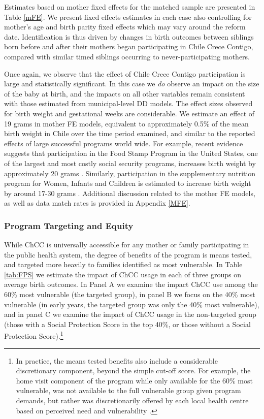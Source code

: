 \documentclass[12pt]{article}
\begin{document}
\begin{spacing}{1.4}
Estimates based on mother fixed effects for the matched sample
are presented in Table \ref{mFE}. We present fixed effects
estimates in each case also controlling for mother's age and birth
parity fixed effects which may vary around the reform date.
Identification is thus driven by changes in birth outcomes between
siblings born before and after their
mothers began participating in Chile Crece Contigo, compared with
similar timed siblings occurring to never-participating mothers.

Once again, we observe that the effect of Chile Crece Contigo
participation is large and statistically significant.  In this
case we \emph{do} observe an impact on the size of the baby at
birth, and the impacts on all other variables remain consistent
with those estimated from municipal-level DD models.  The effect
sizes observed for birth weight and gestational weeks are
considerable.  We estimate an effect of 19 grams in mother FE
models, equivalent to approximately 0.5\% of the mean birth
weight in Chile over the time period examined, and similar to the
reported effects of large successful programs world wide.  For
example, recent evidence suggests that participation in the Food
Stamp Program in the United States, one of the largest and most
costly social security programs, increases birth weight by
approximately 20 grams \citep{Almondetal2011}. Similarly,
participation in the supplementary nutrition program for Women,
Infants and Children is estimated to increase birth weight
by around 17-30 grams \citep{Hoynesetal2011,RossinSlater2013}.
Additional discussion related to the mother FE models, as well
as data match rates is provided in Appendix \ref{MFE}.


\subsubsection{Program Targeting and Equity}
While ChCC is universally accessible for any mother or family
participating in the public health system, the degree of benefits
of the program is means tested, and targeted more heavily to
families identified as most vulnerable.  In Table \ref{tab:FPS}
we estimate the impact of ChCC usage in each of three groups on
average birth outcomes.  In Panel A we examine the impact ChCC
use among the 60\% most vulnerable (the targeted group), in panel
B we focus on the 40\% most vulnerable (in early years, the targeted
group was only the 40\% most vulnerable), and in panel C we
examine the impact of ChCC usage in the non-targeted group (those
with a Social Protection Score in the top 40\%, or those without a
Social Protection Score).\footnote{In practice, the means
  tested benefits also include a considerable discretionary
  component, beyond the simple cut-off score.  For example, the
  home visit component of the program while only available for
  the 60\% most vulnerable, was not available to the full
  vulnerable group given program demands, but rather was
  discretionarily offered by each local health centre based
on perceived need and vulnerability \citep{MDS2014}.}


\end{spacing}
\end{document}
